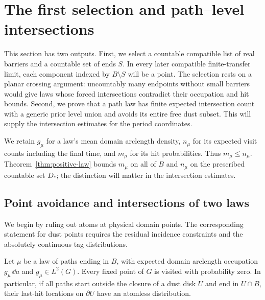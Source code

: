 \section{The first selection and path--level intersections}
\label{sec:selection}

This section has two outputs.  First, we select a countable compatible
list of real barriers and a countable set of ends $S$.  In every later
compatible finite-transfer limit, each component indexed by $B\setminus S$
will be a point.  The selection rests on a planar crossing argument:
uncountably many endpoints without small barriers would give laws whose forced
intersections contradict their occupation and hit bounds.  Second, we
prove that a path law has finite expected intersection count with a
generic prior level union and avoids its entire free dust subset.  This
will supply the intersection estimates for the period coordinates.

We retain $g_\mu$ for a law's mean domain arclength density, $n_\mu$
for its expected visit counts including the final time, and $m_\mu$ for
its hit probabilities.  Thus $m_\mu\le n_\mu$.
Theorem~\ref{thm:positive-law} bounds $m_\mu$ on all of $B$ and
$n_\mu$ on the prescribed countable set $D_*$; the distinction will
matter in the intersection estimates.

\subsection{Point avoidance and intersections of two laws}

We begin by ruling out atoms at physical domain points.  The corresponding
statement for dust points requires the residual incidence constraints and
the absolutely continuous tag distributions.

\begin{lemma}
\label{lem:point-avoidance}
Let $\mu$ be a law of paths ending in $B$, with expected domain arclength
occupation $g_\mu\,\dd a$ and $g_\mu\in L^2(G)$.  Every fixed point of $G$ is
visited with probability zero.  In particular, if all paths start outside
the closure of a dust disk $U$ and end in $U\cap B$, their last-hit
locations on $\partial U$ have an atomless distribution.
\end{lemma}

